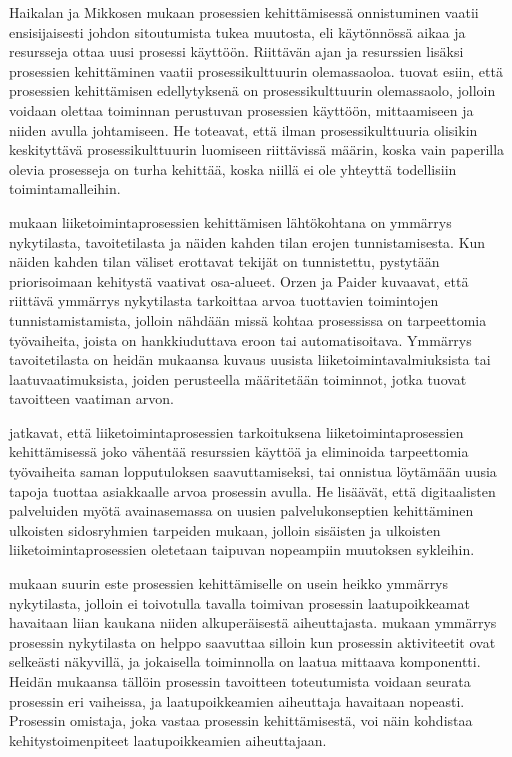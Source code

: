 \documentclass[finnish,12pt,a4paper,pdftex]{article}
\begin{document}
Haikalan ja Mikkosen \citeyearpar{okaytannot} mukaan prosessien kehittämisessä onnistuminen vaatii ensisijaisesti johdon sitoutumista tukea muutosta, eli käytönnössä aikaa ja resursseja ottaa uusi prosessi käyttöön. Riittävän ajan ja resurssien lisäksi prosessien kehittäminen vaatii prosessikulttuurin olemassaoloa.  \cite{teollisuustalous} tuovat esiin, että prosessien kehittämisen edellytyksenä on prosessikulttuurin olemassaolo, jolloin voidaan olettaa toiminnan perustuvan prosessien käyttöön, mittaamiseen ja niiden avulla johtamiseen. He toteavat, että ilman prosessikulttuuria olisikin keskityttävä prosessikulttuurin luomiseen riittävissä määrin, koska vain paperilla olevia prosesseja on turha kehittää, koska niillä ei ole yhteyttä todellisiin toimintamalleihin.

\cite{leanit} mukaan liiketoimintaprosessien kehittämisen lähtökohtana on ymmärrys nykytilasta, tavoitetilasta ja näiden kahden tilan erojen tunnistamisesta. Kun näiden kahden tilan väliset erottavat tekijät on tunnistettu, pystytään priorisoimaan kehitystä vaativat osa-alueet. Orzen ja Paider kuvaavat, että riittävä ymmärrys nykytilasta tarkoittaa arvoa tuottavien toimintojen tunnistamistamista, jolloin nähdään missä kohtaa prosessissa on tarpeettomia työvaiheita, joista on hankkiuduttava eroon tai automatisoitava. Ymmärrys tavoitetilasta on heidän mukaansa kuvaus uusista liiketoimintavalmiuksista tai laatuvaatimuksista, joiden perusteella määritetään  toiminnot, jotka tuovat tavoitteen vaatiman arvon. 

\cite{leanit} jatkavat, että liiketoimintaprosessien tarkoituksena liiketoimintaprosessien kehittämisessä joko vähentää resurssien käyttöä ja eliminoida tarpeettomia työvaiheita saman lopputuloksen saavuttamiseksi, tai onnistua löytämään uusia tapoja tuottaa asiakkaalle arvoa prosessin avulla. He lisäävät, että digitaalisten palveluiden myötä avainasemassa on uusien palvelukonseptien kehittäminen ulkoisten sidosryhmien tarpeiden mukaan, jolloin sisäisten ja ulkoisten liiketoimintaprosessien oletetaan taipuvan nopeampiin muutoksen sykleihin.

\cite{teollisuustalous} mukaan suurin este prosessien kehittämiselle on usein heikko ymmärrys nykytilasta, jolloin ei toivotulla tavalla toimivan prosessin laatupoikkeamat havaitaan liian kaukana niiden alkuperäisestä aiheuttajasta. \cite{ohjelmistotuotanto} mukaan ymmärrys prosessin nykytilasta on helppo saavuttaa silloin kun prosessin aktiviteetit ovat selkeästi näkyvillä, ja jokaisella toiminnolla on laatua mittaava komponentti. Heidän mukaansa tällöin prosessin tavoitteen toteutumista voidaan seurata prosessin eri vaiheissa, ja laatupoikkeamien aiheuttaja havaitaan nopeasti. Prosessin omistaja, joka vastaa prosessin kehittämisestä, voi näin kohdistaa kehitystoimenpiteet laatupoikkeamien aiheuttajaan.
\end{document}
